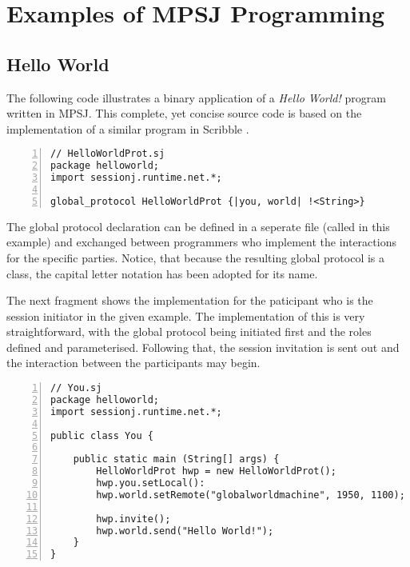 \cleardoublepage
\chapter{Examples of MPSJ Programming}
\label{ch:examples}

\section{Hello World}

The following code illustrates a binary application of a \textit{Hello World!} program written in MPSJ. This complete, yet concise source code is based on the implementation of a similar program in Scribble \cite{scribble}.

\begin{lstlisting}[basicstyle=\LISTINGSTYLE, numbers=left, caption=Global Declaration of \textit{HelloWorldProt}]
// HelloWorldProt.sj
package helloworld; 
import sessionj.runtime.net.*;
 
global_protocol HelloWorldProt {|you, world| !<String>}
\end{lstlisting}

The global protocol declaration can be defined in a seperate file (called  in this example) and exchanged between programmers who implement the interactions for the specific parties. Notice, that because the resulting global protocol is a class, the capital letter notation has been adopted for its name.

The next fragment shows the implementation for the paticipant  who is the session initiator in the given example. The implementation of this is very straightforward, with the global protocol being initiated first and the roles defined and parameterised. Following that, the session invitation is sent out and the interaction between the participants may begin.

\begin{lstlisting}[basicstyle=\LISTINGSTYLE, numbers=left, caption=Implementation for participant \textit{you}]
// You.sj
package helloworld; 
import sessionj.runtime.net.*;
 
public class You {
	
	public static main (String[] args) {
		HelloWorldProt hwp = new HelloWorldProt();
		hwp.you.setLocal():
		hwp.world.setRemote("globalworldmachine", 1950, 1100);
	
		hwp.invite();
		hwp.world.send("Hello World!");
	} 
}
\end{lstlisting}

